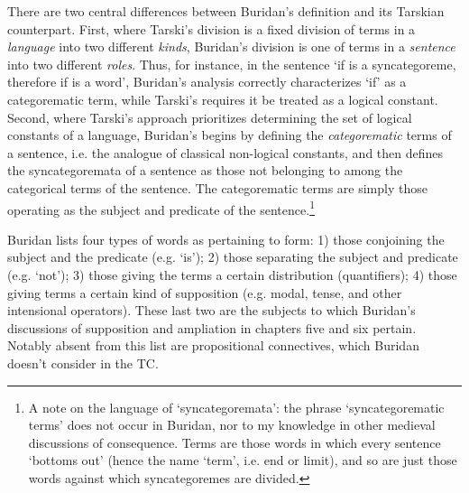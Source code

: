 \documentclass[]{article}
\begin{document}
There are two central differences between Buridan's definition and its Tarskian counterpart. First, where Tarski's division is a fixed division of terms in a \textit{language} into two different \textit{kinds}, Buridan's division is one of terms in a \textit{sentence} into two different \textit{roles}. Thus, for instance, in the sentence `if is a syncategoreme, therefore if is a word', Buridan's analysis correctly characterizes `if' as a categorematic term, while Tarski's requires it be treated as a logical constant. Second, where Tarski's approach prioritizes determining the set of logical constants of a language, Buridan's begins by defining the \textit{categorematic} terms of a sentence, i.e. the analogue of classical non-logical constants, and then defines the syncategoremata of a sentence as those not belonging to among the categorical terms of the sentence. The categorematic terms are simply those operating as the subject and predicate of the sentence.\footnote{A note on the language of `syncategoremata': the phrase `syncategorematic terms' does not occur in Buridan, nor to my knowledge in other medieval discussions of consequence. Terms are those words in which every sentence `bottoms out' (hence the name `term', i.e. end or limit), and so are just those words against which syncategoremes are divided.}

Buridan lists four types of words as pertaining to form: 1) those conjoining the subject and the predicate (e.g. `is'); 2) those separating the subject and predicate (e.g. `not'); 3) those giving the terms a certain distribution (quantifiers); 4) those giving terms a certain kind of supposition (e.g. modal, tense, and other intensional operators). These last two are the subjects to which Buridan's discussions of supposition and ampliation in chapters five and six pertain. Notably absent from this list are propositional connectives, which Buridan doesn't consider in the TC.
\end{document}
